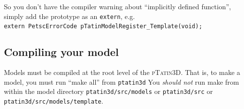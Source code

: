 \documentclass[paper=a4, fontsize=10pt,twoside]{scrartcl}
\newcommand{\ptat}{{{\textsc{pTatin3D}}}}
\newcommand{\shellcmd}[1]{\\\indent\indent\texttt{\hspace{5mm}\footnotesize #1}\\}
\newcommand{\unix}[1]{\texttt{\footnotesize #1}}
\begin{document}
{{\begin{enumerate}
So you don't have the compiler warning about ``implicitly defined function'', simply add the prototype as an \unix{extern}, e.g.
	\shellcmd{extern PetscErrorCode pTatinModelRegister\_Template(void);}
\end{enumerate}

\subsection{Compiling your model}
Models must be compiled at the root level of the {\ptat}.
That is, to make a model, you must run ``make all'' from
	\unix{ptatin3d}
You \textit{should not} run make from within the model directory
	\unix{ptatin3d/src/models}
or
	\unix{ptatin3d/src}
or
	\unix{ptatin3d/src/models/template}.

}}
\end{document}
